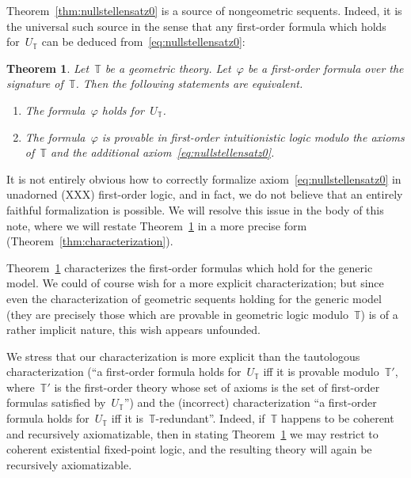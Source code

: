 \documentclass[oneside,reqno]{amsart}
\theoremstyle{definition}
\theoremstyle{plain}
\newtheorem{thm}[defn]{Theorem}
\theoremstyle{remark}
\newcommand{\TT}{\mathbb{T}}
\renewcommand{\_}{\mathpunct{.}\,}
\newcommand{\?}{\,{:}\,}
\begin{document}
Theorem~\ref{thm:nullstellensatz0} is a source of nongeometric sequents. Indeed,
it is the universal such source in the sense that any first-order formula
which holds for~$U_\TT$ can be deduced from~\eqref{eq:nullstellensatz0}:

\begin{thm}\label{thm:characterization0}
Let~$\TT$ be a geometric theory. Let~$\varphi$ be a first-order
formula over the signature of~$\TT$. Then the following statements are
equivalent.
\begin{enumerate}
\item The formula~$\varphi$ holds for~$U_\TT$. \smallskip
\item The formula~$\varphi$ is provable in first-order intuitionistic logic
modulo the axioms of~$\TT$ and the additional axiom~\eqref{eq:nullstellensatz0}.
\end{enumerate}
\end{thm}

It is not entirely obvious how to correctly formalize
axiom~\eqref{eq:nullstellensatz0} in unadorned (XXX) first-order logic, and in
fact, we do not believe that an entirely faithful formalization is possible.
We will resolve this issue in the body of this note, where we will restate
Theorem~\ref{thm:characterization0} in a more precise form (Theorem~\ref{thm:characterization}).

Theorem~\ref{thm:characterization0} characterizes the first-order formulas
which hold for the generic model. We could of course wish for a more explicit
characterization; but since even the characterization of geometric sequents
holding for the generic model (they are precisely those which are provable in
geometric logic modulo~$\TT$) is of a rather implicit nature, this wish appears
unfounded.

We stress that our characterization is more explicit than the tautologous
characterization (``a first-order formula holds for~$U_\TT$ iff it is provable
modulo~$\TT'$, where~$\TT'$ is the first-order theory whose set of axioms is the
set of first-order formulas satisfied by~$U_\TT$'') and the (incorrect)
characterization ``a first-order formula holds for~$U_\TT$ iff it
is~$\TT$-redundant''. Indeed, if~$\TT$ happens to be coherent and recursively
axiomatizable, then in stating Theorem~\ref{thm:characterization0} we may
restrict to coherent existential fixed-point logic, and the resulting theory
will again be recursively axiomatizable.
\medskip


\end{document}
